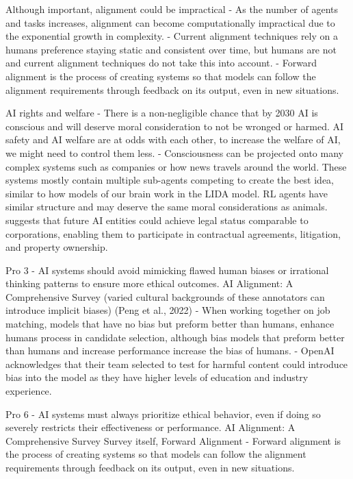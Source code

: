 Although important, alignment could be impractical
\citep{nayebi_barriers_2025} - As the number of agents and tasks increases, alignment can become computationally impractical due to the exponential growth in complexity.
\citep{carroll_ai_2024} - Current alignment techniques rely on a humans preference staying static and consistent over time, but humans are not and current alignment techniques do not take this into account.
\citep{ji_ai_2023} - Forward alignment is the process of creating systems so that models can follow the alignment requirements through feedback on its output, even in new situations.

AI rights and welfare
\citep{sebo_moral_2025} - There is a non-negligible chance that by 2030 AI is conscious and will deserve moral consideration to not be wronged or harmed. AI safety and AI welfare are at odds with each other, to increase the welfare of AI, we might need to control them less.
\citep{tomasik_dialogue_2015} - Consciousness can be projected onto many complex systems such as companies or how news travels around the world. These systems mostly contain multiple sub-agents competing to create the best idea, similar to how models of our brain work in the LIDA model. RL agents have similar structure and may deserve the same moral considerations as animals.
\cite{ward_towards_2025} suggests that future AI entities could achieve legal status comparable to corporations, enabling them to participate in contractual agreements, litigation, and property ownership.




Pro 3 - AI systems should avoid mimicking flawed human biases or irrational thinking patterns to ensure more ethical outcomes.
AI Alignment: A Comprehensive Survey
(varied cultural backgrounds of these annotators can introduce implicit biases)
(Peng et al., 2022)
\citep{peng_investigations_2022} - When working together on job matching, models that have no bias but preform better than humans, enhance humans process in candidate selection, although bias models that preform better than humans and increase performance increase the bias of humans.
\citep{openai_gpt_4_2023} - OpenAI acknowledges that their team selected to test for harmful content could introduce bias into the model as they have higher levels of education and industry experience.

Pro 6 - AI systems must always prioritize ethical behavior, even if doing so severely restricts their effectiveness or performance.
AI Alignment: A Comprehensive Survey
Survey itself, Forward Alignment
\citep{ji_ai_2023} - Forward alignment is the process of creating systems so that models can follow the alignment requirements through feedback on its output, even in new situations.

